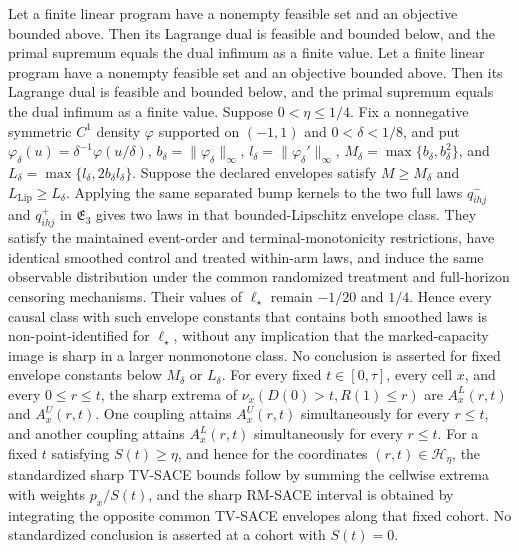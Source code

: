 Let a finite linear program have a nonempty feasible set and an objective bounded above.  Then its Lagrange dual is feasible and bounded below, and the primal supremum equals the dual infimum as a finite value.
Let a finite linear program have a nonempty feasible set and an objective bounded above.  Then its Lagrange dual is feasible and bounded below, and the primal supremum equals the dual infimum as a finite value.
Suppose \(0<\eta\leq1/4\).  Fix a nonnegative symmetric \(C^1\) density \(\varphi\) supported on \((-1,1)\) and \(0<\delta<1/8\), and put \(\varphi_\delta(u)=\delta^{-1}\varphi(u/\delta)\), \(b_\delta=\|\varphi_\delta\|_\infty\), \(l_\delta=\|\varphi_\delta'\|_\infty\), \(M_\delta=\max\{b_\delta,b_\delta^2\}\), and \(L_\delta=\max\{l_\delta,2b_\delta l_\delta\}\).  Suppose the declared envelopes satisfy \(M\geq M_\delta\) and \(L_{\mathrm{Lip}}\geq L_\delta\).  Applying the same separated bump kernels to the two full laws \(q^-_{ihj}\) and \(q^+_{ihj}\) in \(\mathfrak E_3\) gives two laws in that bounded-Lipschitz envelope class.  They satisfy the maintained event-order and terminal-monotonicity restrictions, have identical smoothed control and treated within-arm laws, and induce the same observable distribution under the common randomized treatment and full-horizon censoring mechanisms.  Their values of \(\ell_\star\) remain \(-1/20\) and \(1/4\).  Hence every causal class with such envelope constants that contains both smoothed laws is non-point-identified for \(\ell_\star\), without any implication that the marked-capacity image is sharp in a larger nonmonotone class.  No conclusion is asserted for fixed envelope constants below \(M_\delta\) or \(L_\delta\).
For every fixed \(t\in[0,\tau]\), every cell \(x\), and every \(0\leq r\leq t\), the sharp extrema of \(\nu_x(D(0)>t,R(1)\leq r)\) are \(A^L_x(r,t)\) and \(A^U_x(r,t)\).  One coupling attains \(A^U_x(r,t)\) simultaneously for every \(r\leq t\), and another coupling attains \(A^L_x(r,t)\) simultaneously for every \(r\leq t\).  For a fixed \(t\) satisfying \(S(t)\geq\eta\), and hence for the coordinates \((r,t)\in\mathcal H_\eta\), the standardized sharp TV-SACE bounds follow by summing the cellwise extrema with weights \(p_x/S(t)\), and the sharp RM-SACE interval is obtained by integrating the opposite common TV-SACE envelopes along that fixed cohort.  No standardized conclusion is asserted at a cohort with \(S(t)=0\).
